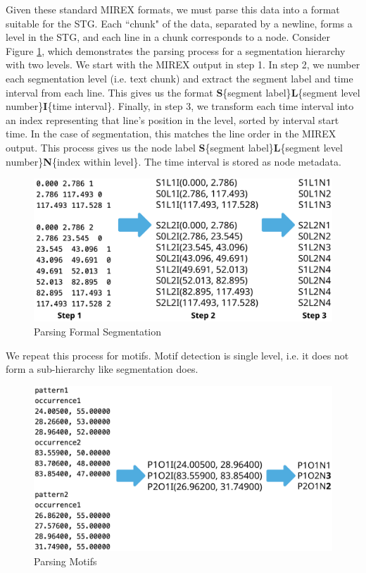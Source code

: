 \documentclass{article}
\begin{document}
Given these standard MIREX formats, we must parse this data into a format suitable for the STG. Each ``chunk" of the data, separated by a newline, forms a level in the STG, and each line in a chunk corresponds to a node. Consider Figure \ref{fig:form_parse}, which demonstrates the parsing process for a segmentation hierarchy with two levels. We start with the MIREX output in step 1. In step 2, we number each segmentation level (i.e. text chunk) and extract the segment label and time interval from each line. This gives us the format \textbf{S}\{segment label\}\textbf{L}\{segment level number\}\textbf{I}\{time interval\}. Finally, in step 3, we transform each time interval into an index representing that line's position in the level, sorted by interval start time. In the case of segmentation, this matches the line order in the MIREX output. This process gives us the node label \textbf{S}\{segment label\}\textbf{L}\{segment level number\}\textbf{N}\{index within level\}. The time interval is stored as node metadata.
\begin{figure}[H]
  \centering
  \includegraphics[width=\linewidth]{figs/form_parse}
  \caption{Parsing Formal Segmentation}
  \label{fig:form_parse}
\end{figure}

We repeat this process for motifs. Motif detection is single level, i.e. it does not form a sub-hierarchy like segmentation does. 

\begin{figure}[h!]
  \centering
  \includegraphics[width=\linewidth]{figs/motif_parse}
  \caption{Parsing Motifs}
  \label{fig:motif_parse}
\end{figure}
\end{document}
